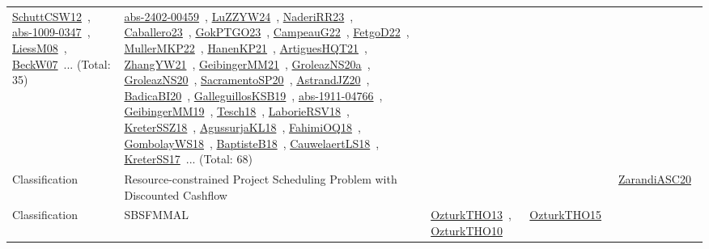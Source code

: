 {\begin{longtable}{lp{3cm}>{\raggedright\arraybackslash}p{6cm}>{\raggedright\arraybackslash}p{6cm}>{\raggedright\arraybackslash}p{8cm}}
\href{../works/SchuttCSW12.pdf}{SchuttCSW12}~\cite{SchuttCSW12}, \href{../works/abs-1009-0347.pdf}{abs-1009-0347}~\cite{abs-1009-0347}, \href{../works/LiessM08.pdf}{LiessM08}~\cite{LiessM08}, \href{../works/BeckW07.pdf}{BeckW07}~\cite{BeckW07}... (Total: 35) & \href{../works/abs-2402-00459.pdf}{abs-2402-00459}~\cite{abs-2402-00459}, \href{../works/LuZZYW24.pdf}{LuZZYW24}~\cite{LuZZYW24}, \href{../works/NaderiRR23.pdf}{NaderiRR23}~\cite{NaderiRR23}, \href{../works/Caballero23.pdf}{Caballero23}~\cite{Caballero23}, \href{../works/GokPTGO23.pdf}{GokPTGO23}~\cite{GokPTGO23}, \href{../works/CampeauG22.pdf}{CampeauG22}~\cite{CampeauG22}, \href{../works/FetgoD22.pdf}{FetgoD22}~\cite{FetgoD22}, \href{../works/MullerMKP22.pdf}{MullerMKP22}~\cite{MullerMKP22}, \href{../works/HanenKP21.pdf}{HanenKP21}~\cite{HanenKP21}, \href{../works/ArtiguesHQT21.pdf}{ArtiguesHQT21}~\cite{ArtiguesHQT21}, \href{../works/ZhangYW21.pdf}{ZhangYW21}~\cite{ZhangYW21}, \href{../works/GeibingerMM21.pdf}{GeibingerMM21}~\cite{GeibingerMM21}, \href{../works/GroleazNS20a.pdf}{GroleazNS20a}~\cite{GroleazNS20a}, \href{../works/GroleazNS20.pdf}{GroleazNS20}~\cite{GroleazNS20}, \href{../works/SacramentoSP20.pdf}{SacramentoSP20}~\cite{SacramentoSP20}, \href{../works/AstrandJZ20.pdf}{AstrandJZ20}~\cite{AstrandJZ20}, \href{../works/BadicaBI20.pdf}{BadicaBI20}~\cite{BadicaBI20}, \href{../works/GalleguillosKSB19.pdf}{GalleguillosKSB19}~\cite{GalleguillosKSB19}, \href{../works/abs-1911-04766.pdf}{abs-1911-04766}~\cite{abs-1911-04766}, \href{../works/GeibingerMM19.pdf}{GeibingerMM19}~\cite{GeibingerMM19}, \href{../works/Tesch18.pdf}{Tesch18}~\cite{Tesch18}, \href{../works/LaborieRSV18.pdf}{LaborieRSV18}~\cite{LaborieRSV18}, \href{../works/KreterSSZ18.pdf}{KreterSSZ18}~\cite{KreterSSZ18}, \href{../works/AgussurjaKL18.pdf}{AgussurjaKL18}~\cite{AgussurjaKL18}, \href{../works/FahimiOQ18.pdf}{FahimiOQ18}~\cite{FahimiOQ18}, \href{../works/GombolayWS18.pdf}{GombolayWS18}~\cite{GombolayWS18}, \href{../works/BaptisteB18.pdf}{BaptisteB18}~\cite{BaptisteB18}, \href{../works/CauwelaertLS18.pdf}{CauwelaertLS18}~\cite{CauwelaertLS18}, \href{../works/KreterSS17.pdf}{KreterSS17}~\cite{KreterSS17}... (Total: 68)\\
Classification & Resource-constrained Project Scheduling Problem with Discounted Cashflow &  &  & \href{../works/ZarandiASC20.pdf}{ZarandiASC20}~\cite{ZarandiASC20}\\
Classification & SBSFMMAL & \href{../works/OzturkTHO13.pdf}{OzturkTHO13}~\cite{OzturkTHO13}, \href{../works/OzturkTHO10.pdf}{OzturkTHO10}~\cite{OzturkTHO10} & \href{../works/OzturkTHO15.pdf}{OzturkTHO15}~\cite{OzturkTHO15} & \\

\end{longtable}}
